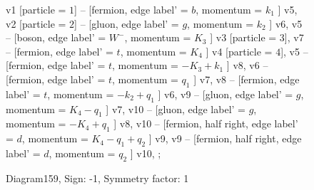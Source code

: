 \documentclass{revtex4}
\begin{document}
\begin{figure}[!htb]
\begin{center}
{    %
v1 [particle = \(1\)] -- [fermion, edge label' = \(b\), momentum = \(k_{1}\) ] v5, 
v2 [particle = \(2\)] -- [gluon, edge label' = \(g\), momentum = \(k_{2}\) ] v6, 
v5 -- [boson, edge label' = \(W^{-}\), momentum = \(K_{3}\) ] v3 [particle = \(3\)], 
v7 -- [fermion, edge label' = \(t\), momentum = \(K_{4}\) ] v4 [particle = \(4\)], 
v5 -- [fermion, edge label' = \(t\), momentum = \(-K_{3} + k_{1}\) ] v8, 
v6 -- [fermion, edge label' = \(t\), momentum = \(q_{1}\) ] v7, 
v8 -- [fermion, edge label' = \(t\), momentum = \(-k_{2} + q_{1}\) ] v6, 
v9 -- [gluon, edge label' = \(g\), momentum = \(K_{4} - q_{1}\) ] v7, 
v10 -- [gluon, edge label' = \(g\), momentum = \(-K_{4} + q_{1}\) ] v8, 
v10 -- [fermion, half right, edge label' = \(d\), momentum = \(K_{4} - q_{1} + q_{2}\) ] v9, 
v9 -- [fermion, half right, edge label' = \(d\), momentum = \(q_{2}\) ] v10, 
};
\end{center}
\caption{Diagram159, Sign: -1, Symmetry factor: 1}
\end{figure}
\newpage
\end{document}

